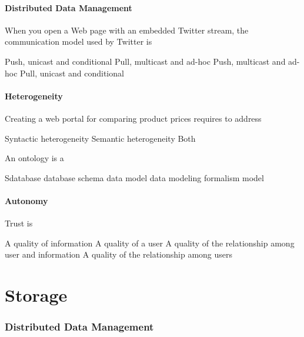 \documentclass[12pt,a4paper]{exam} %
\begin{document}
\begin{flushleft}
\begin{multicols*}{2}
\begin{questions}
\subsection{Distributed Data Management}

\question When you open a Web page with an embedded Twitter stream, the communication model used by Twitter is
\begin{checkboxes}
\choice Push, unicast and conditional
\choice Pull, multicast and ad-hoc
\choice Push, multicast and ad-hoc
\choice Pull, unicast and conditional
\end{checkboxes}


\subsection{Heterogeneity}

\question Creating a web portal for comparing product prices requires to address
\begin{checkboxes}
\choice Syntactic heterogeneity
\choice Semantic heterogeneity
\choice Both
\end{checkboxes}

\question An ontology is a
\begin{checkboxes}
\choice Sdatabase
\choice database schema
\choice data model
\choice data modeling formalism
\choice model
\end{checkboxes}


\subsection{Autonomy}

\question Trust is
\begin{checkboxes}
\choice A quality of information
\choice A quality of a user
\choice A quality of the relationship among user and information
\choice A quality of the relationship among users
\end{checkboxes}



\part{Storage}
\section{Distributed Data Management}


\end{questions}
\end{multicols*}
\end{flushleft}
\end{document}

